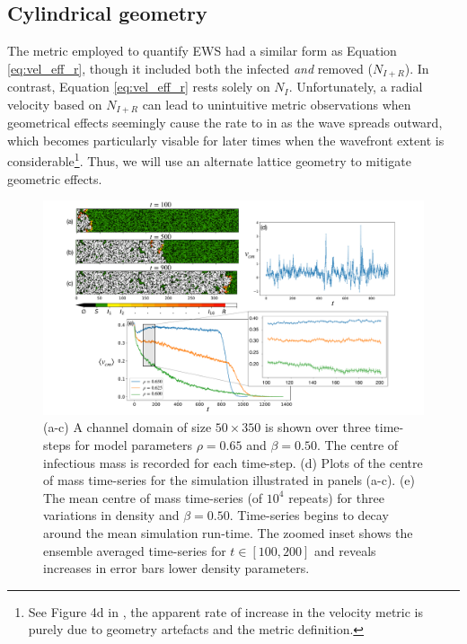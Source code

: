 \subsection{Cylindrical geometry}

The metric \cite{OROZCOFUENTES201912} employed to quantify EWS had a similar form as Equation \ref{eq:vel_eff_r}, 
though it included both the infected \textit{and} removed ($N_{I+R}$). In contrast, Equation \ref{eq:vel_eff_r} rests solely on $N_I$. 
Unfortunately, a radial velocity based on $N_{I+R}$ can lead to unintuitive metric observations when geometrical effects seemingly cause the rate to in as the wave spreads outward, which
becomes particularly visable for later times when the wavefront extent is considerable\footnote{
See Figure 4d in \cite{OROZCOFUENTES201912}, the apparent rate of increase in the velocity metric is purely due to geometry artefacts and the metric definition.}.
Thus, we will use an alternate lattice geometry to mitigate geometric effects.

\begin{figure}
    \centering
    \includegraphics[scale=0.30]{chapter4/figures/figure1-channel-domain.pdf}
    \caption{
    (a-c) A channel domain of size $50\times350$ is shown over three time-steps for model parameters $\rho=0.65$ and $\beta=0.50$. 
    The centre of infectious mass is recorded for each time-step. 
    (d) Plots of the centre of mass time-series for the simulation illustrated in panels (a-c). 
    (e) The mean centre of mass time-series (of $10^4$ repeats) for three variations in density and $\beta=0.50$. 
    Time-series begins to decay around the mean simulation run-time.  
    The zoomed inset shows the ensemble averaged time-series for $t\in[100, 200]$ and reveals increases in error bars lower density parameters.
    }
    \label{fig:ews-primer}
\end{figure}

